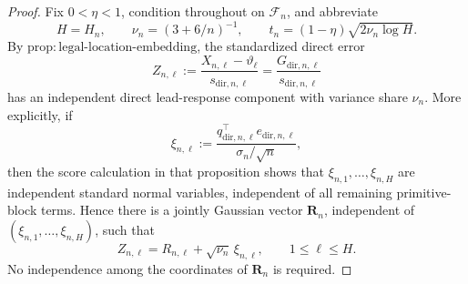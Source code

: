 \documentclass{article}
\begin{document}
\begin{proof}
Fix \(0<\eta<1\), condition throughout on \(\mathcal F_n\), and abbreviate
\[
 H=H_n,\qquad
 \nu_n=(3+6/n)^{-1},\qquad
 t_n=(1-\eta)\sqrt{2\nu_n\log H}.
\]
By \(\mathrm{prop{:}legal\mbox{-}location\mbox{-}embedding}\), the standardized
direct error
\[
 Z_{n,\ell}
 :=\frac{X_{n,\ell}-\vartheta_\ell}{s_{\mathrm{dir},n,\ell}}
 =\frac{G_{\mathrm{dir},n,\ell}}{s_{\mathrm{dir},n,\ell}}
\]
has an independent direct lead-response component with variance share
\(\nu_n\).  More explicitly, if
\[
 \xi_{n,\ell}
 :=\frac{q_{\mathrm{dir},n,\ell}^{\top}
              e_{\mathrm{dir},n,\ell}}{\sigma_n/\sqrt n},
\]
then the score calculation in that proposition shows that
\(\xi_{n,1},\ldots,\xi_{n,H}\) are independent standard normal variables,
independent of all remaining primitive-block terms.  Hence there is a jointly
Gaussian vector \(\boldsymbol R_n\), independent of
\((\xi_{n,1},\ldots,\xi_{n,H})\), such that
\[
 Z_{n,\ell}=R_{n,\ell}+\sqrt{\nu_n}\,\xi_{n,\ell},
 \qquad 1\leq\ell\leq H.                                    \tag{18}
\]
No independence among the coordinates of \(\boldsymbol R_n\) is required.


\end{proof}
\end{document}
